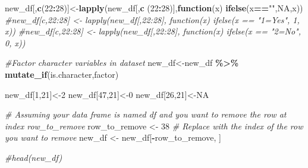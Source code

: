 \documentclass[
]{article}
\newenvironment{Shaded}{\begin{snugshade}}{\end{snugshade}}
\newcommand{\CommentTok}[1]{\textcolor[rgb]{0.56,0.35,0.01}{\textit{#1}}}
\newcommand{\ConstantTok}[1]{\textcolor[rgb]{0.56,0.35,0.01}{#1}}
\newcommand{\ControlFlowTok}[1]{\textcolor[rgb]{0.13,0.29,0.53}{\textbf{#1}}}
\newcommand{\DecValTok}[1]{\textcolor[rgb]{0.00,0.00,0.81}{#1}}
\newcommand{\FunctionTok}[1]{\textcolor[rgb]{0.13,0.29,0.53}{\textbf{#1}}}
\newcommand{\NormalTok}[1]{#1}
\newcommand{\OtherTok}[1]{\textcolor[rgb]{0.56,0.35,0.01}{#1}}
\newcommand{\SpecialCharTok}[1]{\textcolor[rgb]{0.81,0.36,0.00}{\textbf{#1}}}
\newcommand{\StringTok}[1]{\textcolor[rgb]{0.31,0.60,0.02}{#1}}
\begin{document}
\begin{Shaded}
\begin{Highlighting}[]
\NormalTok{new\_df[,}\FunctionTok{c}\NormalTok{(}\DecValTok{22}\SpecialCharTok{:}\DecValTok{28}\NormalTok{)]}\OtherTok{\textless{}{-}}\FunctionTok{lapply}\NormalTok{(new\_df[,}\FunctionTok{c}\NormalTok{ (}\DecValTok{22}\SpecialCharTok{:}\DecValTok{28}\NormalTok{)],}\ControlFlowTok{function}\NormalTok{(x) }\FunctionTok{ifelse}\NormalTok{(x}\SpecialCharTok{==}\StringTok{""}\NormalTok{,}\ConstantTok{NA}\NormalTok{,x))}
\CommentTok{\#new\_df[c,22:28] \textless{}{-} lapply(new\_df[,22:28], function(x) ifelse(x == "1=Yes", 1, x))}
\CommentTok{\#new\_df[c,22:28] \textless{}{-} lapply(new\_df[,22:28], function(x) ifelse(x == "2=No", 0, x))}

\CommentTok{\#Factor character variables in dataset}
\NormalTok{new\_df}\OtherTok{\textless{}{-}}\NormalTok{new\_df }\SpecialCharTok{\%\textgreater{}\%}
  \FunctionTok{mutate\_if}\NormalTok{(is.character,factor)}


\NormalTok{new\_df[}\DecValTok{1}\NormalTok{,}\DecValTok{21}\NormalTok{]}\OtherTok{\textless{}{-}}\DecValTok{2}
\NormalTok{new\_df[}\DecValTok{47}\NormalTok{,}\DecValTok{21}\NormalTok{]}\OtherTok{\textless{}{-}}\DecValTok{0}
\NormalTok{new\_df[}\DecValTok{26}\NormalTok{,}\DecValTok{21}\NormalTok{]}\OtherTok{\textless{}{-}}\ConstantTok{NA}


\CommentTok{\# Assuming your data frame is named \textquotesingle{}df\textquotesingle{} and you want to remove the row at index \textquotesingle{}row\_to\_remove\textquotesingle{}}
\NormalTok{row\_to\_remove }\OtherTok{\textless{}{-}} \DecValTok{38}  \CommentTok{\# Replace with the index of the row you want to remove}
\NormalTok{new\_df }\OtherTok{\textless{}{-}}\NormalTok{ new\_df[}\SpecialCharTok{{-}}\NormalTok{row\_to\_remove, ]}


\CommentTok{\#head(new\_df)}
\end{Highlighting}
\end{Shaded}
\end{document}
